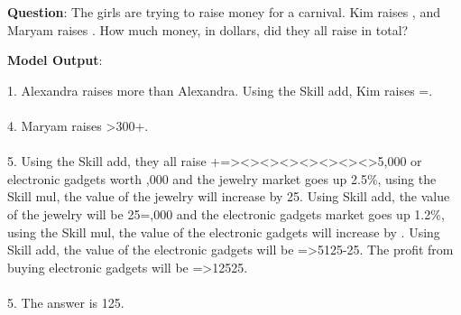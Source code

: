 \documentclass{article} \usepackage{arxiv}
\def\1{\bm{1}}
\begin{document}
\newpage



\begin{tcolorbox}[title = {GSM8K}, colback = Apricot!25!white, colframe = BrickRed!75!black] 
\textbf{Question}:  The girls are trying to raise money for a carnival. Kim raises , and Maryam raises . How much money, in dollars, did they all raise in total? 


\tcblower
\textbf{Model Output}:

\quad

1. Alexandra raises  more than Alexandra. Using the Skill add, Kim raises =. \\ \\
4. Maryam raises \<>300+. \\ \\
5. Using the Skill add, they all raise +=\<><><><><><><><>5,000 or electronic gadgets worth \5,000 and the jewelry market goes up 2.5\%, using the Skill mul, the value of the jewelry will increase by \125.  Using Skill add, the value of the jewelry will be \125=\8,000 and the electronic gadgets market goes up 1.2\%, using the Skill mul, the value of the electronic gadgets will increase by .  Using Skill add, the value of the electronic gadgets will be =\<>5125-\125.  The profit from buying electronic gadgets will be =\<>125\125. \\ \\
5. The answer is 125.

\end{tcolorbox}
\noindent\begin{minipage}{\textwidth}
 \label{Tab:example_compose_gsm8k_skill_2}
\end{minipage}



\newpage
\end{document}
